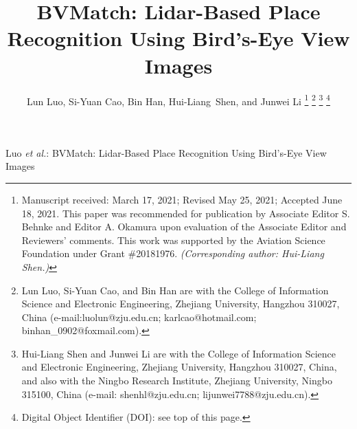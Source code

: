 \documentclass[letterpaper, 10 pt, journal, twoside]{IEEEtran}
\begin{document}




\title{	BVMatch: Lidar-Based Place Recognition Using Bird's-Eye View Images}



\author{Lun Luo, Si-Yuan Cao, Bin Han, Hui-Liang~Shen, and Junwei Li
	\thanks{Manuscript received: March 17, 2021; Revised May 25, 2021; Accepted June 18, 2021. This paper was recommended for publication by Associate Editor S. Behnke and
		Editor A. Okamura upon evaluation of the Associate Editor and Reviewers' comments.
		This work was supported by the Aviation Science Foundation under Grant \#20181976. \emph{(Corresponding author: Hui-Liang Shen.)}} %
	\thanks{Lun Luo, Si-Yuan Cao, and Bin Han are with the College of Information Science and Electronic Engineering, Zhejiang University, Hangzhou 310027, China (e-mail:luolun@zju.edu.cn; karlcao@hotmail.com; binhan\_0902@foxmail.com).}%
	\thanks{Hui-Liang Shen and Junwei Li are with the College of Information Science and Electronic Engineering, Zhejiang University, Hangzhou 310027, China, and also with the Ningbo Research Institute, Zhejiang University, Ningbo 315100, China (e-mail: shenhl@zju.edu.cn; lijunwei7788@zju.edu.cn).}%
	\thanks{Digital Object Identifier (DOI): see top of this page.}
}




{Luo \MakeLowercase{\textit{et al.}}: BVMatch: Lidar-Based Place Recognition Using Bird's-Eye View Images} 

\maketitle

\end{document}
